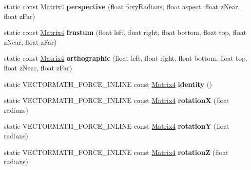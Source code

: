 \begin{DoxyCompactItemize}
static const \hyperlink{classVectormath_1_1Aos_1_1Matrix4}{Matrix4} {\bfseries perspective} (float fovy\+Radians, float aspect, float z\+Near, float z\+Far)
\item 
\mbox{\label{classVectormath_1_1Aos_1_1Matrix4_ad1b95c29754cf39128f5c90779a53d2e}} 
static const \hyperlink{classVectormath_1_1Aos_1_1Matrix4}{Matrix4} {\bfseries frustum} (float left, float right, float bottom, float top, float z\+Near, float z\+Far)
\item 
\mbox{\label{classVectormath_1_1Aos_1_1Matrix4_af2bb0513df5fa3be77b5cef316c94249}} 
static const \hyperlink{classVectormath_1_1Aos_1_1Matrix4}{Matrix4} {\bfseries orthographic} (float left, float right, float bottom, float top, float z\+Near, float z\+Far)
\item 
\mbox{\label{classVectormath_1_1Aos_1_1Matrix4_a5e0e7343c349add9fdc3c392445a237a}} 
static V\+E\+C\+T\+O\+R\+M\+A\+T\+H\+\_\+\+F\+O\+R\+C\+E\+\_\+\+I\+N\+L\+I\+NE const \hyperlink{classVectormath_1_1Aos_1_1Matrix4}{Matrix4} {\bfseries identity} ()
\item 
\mbox{\label{classVectormath_1_1Aos_1_1Matrix4_a0f8e8cdfe45e0832b36e20b676124b5c}} 
static V\+E\+C\+T\+O\+R\+M\+A\+T\+H\+\_\+\+F\+O\+R\+C\+E\+\_\+\+I\+N\+L\+I\+NE const \hyperlink{classVectormath_1_1Aos_1_1Matrix4}{Matrix4} {\bfseries rotationX} (float radians)
\item 
\mbox{\label{classVectormath_1_1Aos_1_1Matrix4_ac7323763ea9343c396c5e94bbd4a0495}} 
static V\+E\+C\+T\+O\+R\+M\+A\+T\+H\+\_\+\+F\+O\+R\+C\+E\+\_\+\+I\+N\+L\+I\+NE const \hyperlink{classVectormath_1_1Aos_1_1Matrix4}{Matrix4} {\bfseries rotationY} (float radians)
\item 
\mbox{\label{classVectormath_1_1Aos_1_1Matrix4_a94b36fc1b5b38772e8b22822a0e7a71f}} 
static V\+E\+C\+T\+O\+R\+M\+A\+T\+H\+\_\+\+F\+O\+R\+C\+E\+\_\+\+I\+N\+L\+I\+NE const \hyperlink{classVectormath_1_1Aos_1_1Matrix4}{Matrix4} {\bfseries rotationZ} (float radians)
\item 
\mbox{\label{classVectormath_1_1Aos_1_1Matrix4_a8220c066c91585446d61a6009b0c4206}} 

\end{DoxyCompactItemize}
